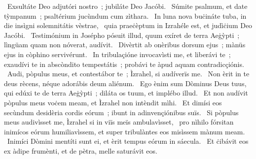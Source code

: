 ~Exsultáte Deo adjutóri nostro~; jubiláte Deo Jacóbi. 
~Súmite psalmum, et date tỳmpanum~; psaltérium jucùndum cum zìthara. 
~In luna nova buċináte tuba, in die insìgni solemnitátis vèstrae, 
~quia praeċèptum in Izrahéle est, et judìċium Deo Jacóbi. 
~Testimónium in Josépho pósuit illud, quum exíret de terra Aeġỳpti~; lìngüam quam non nóverat, audívit. 
~Divèrtit ab onèribus dorsum ejus~; mànüs ejus in còphino servivérunt. 
~In tribulaçióne invocavìsti me, et liberávi te~; exaudívi te in abscòndito tempestátis~; probávi te àpud aquam contradicçiónis. 
~Audi, pòpulus meus, et contestábor te~; Ìzrahel, si audíverïs me. 
~Non èrit in te deus rècens, néque adorábis deum aliénum. 
~Ego ènim sum Dòminus Deus tuus, qui edúxi te de terra Aeġỳpti~; diláta os tuum, et implébo illud. 
~Et non audívit pòpulus meus voċem meam, et Ìzrahel non intèndit mìhi. 
~Et dimísi eos secùndum desidèria cordis eórum~; ibunt in adinvençiónibus suïs. 
~Si pòpulus meus audivìsset me, Ìzrahel si in viïs meïs ambulavìsset, 
~pro nìhilo fórsitan inimícos eórum humiliavìssem, et super tribulàntes eos misìssem mànum meam. 
~Inimíci Dòmini mentíti sunt ei, et èrit tempus eórum in sáecula. 
~Et ċibávit eos ex àdipe frumènti, et de pètra, melle saturávit eos. 

